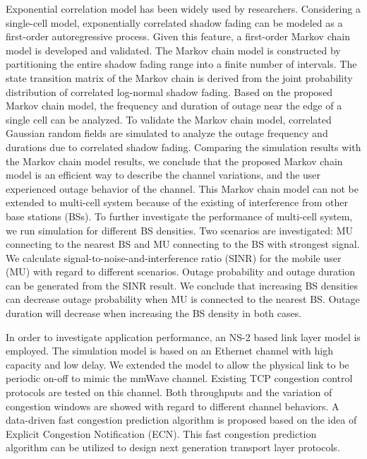 \par Exponential correlation model has been widely used by researchers. Considering a single-cell model, exponentially correlated shadow fading can be modeled as a first-order autoregressive process.  Given this feature, a first-order Markov chain model is developed and validated. The Markov chain model is constructed by partitioning the entire shadow fading range into a finite number of intervals. The state transition matrix of the Markov chain is derived from the joint probability distribution of correlated log-normal shadow fading. Based on the proposed Markov chain model, the frequency and duration of outage near the edge of a single cell can be analyzed. To validate the Markov chain model, correlated Gaussian random fields are simulated to analyze the outage frequency and durations due to correlated shadow fading. Comparing the simulation results with the Markov chain model results, we conclude  that the proposed Markov chain model is an efficient way to describe the channel variations, and the user experienced outage behavior of the channel. This Markov chain model can not be extended to multi-cell system because of the existing of interference from other base stations (BSs).  To further investigate the performance of multi-cell system, we run simulation for different BS densities. Two scenarios are investigated: MU connecting to the nearest BS and MU connecting to the BS with strongest signal. We calculate signal-to-noise-and-interference ratio (SINR) for the mobile user (MU) with regard to different scenarios. Outage probability and outage duration can be generated from the SINR result. We conclude  that increasing BS densities can decrease outage probability when MU is connected to the nearest BS. Outage duration will decrease when increasing the BS density in both cases. 

\par {} In order to investigate application performance, an NS-2  based link layer model is employed. The simulation model is based on an Ethernet channel with high capacity and low delay. We extended the model to allow the physical link to be periodic on-off to mimic the mmWave channel. Existing TCP congestion control protocols are tested on this channel. Both throughputs and the variation of congestion windows are showed with regard to different channel behaviors. A data-driven fast congestion prediction algorithm is proposed based on the idea of Explicit Congestion Notification (ECN). This fast congestion prediction algorithm can be utilized to design next generation transport layer protocols.
